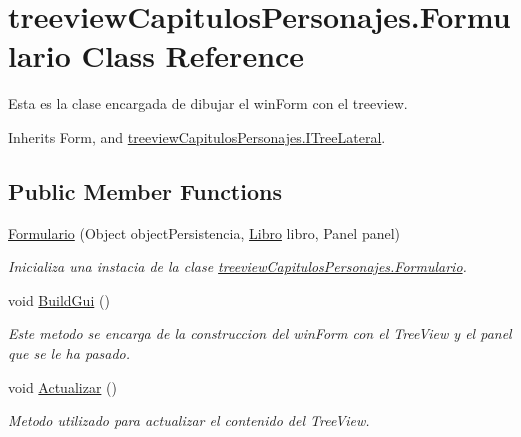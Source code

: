 \hypertarget{classtreeview_capitulos_personajes_1_1_formulario}{\section{treeview\-Capitulos\-Personajes.\-Formulario Class Reference}
\label{classtreeview_capitulos_personajes_1_1_formulario}
}


Esta es la clase encargada de dibujar el win\-Form con el treeview.  




Inherits Form, and \hyperlink{interfacetreeview_capitulos_personajes_1_1_i_tree_lateral}{treeview\-Capitulos\-Personajes.\-I\-Tree\-Lateral}.

\subsection*{Public Member Functions}
\begin{DoxyCompactItemize}
\item 
\hyperlink{classtreeview_capitulos_personajes_1_1_formulario_a0985245ae162dee8885a38bfe08dc213}{Formulario} (Object object\-Persistencia, \hyperlink{classtreeview_capitulos_personajes_1_1_libro}{Libro} libro, Panel panel)
\begin{DoxyCompactList}\small\item\em Inicializa una instacia de la clase \hyperlink{classtreeview_capitulos_personajes_1_1_formulario}{treeview\-Capitulos\-Personajes.\-Formulario}. \end{DoxyCompactList}\item 
void \hyperlink{classtreeview_capitulos_personajes_1_1_formulario_a9efb8a9a36cd60cb1b9d1ed4c7058fc2}{Build\-Gui} ()
\begin{DoxyCompactList}\small\item\em Este metodo se encarga de la construccion del win\-Form con el Tree\-View y el panel que se le ha pasado. \end{DoxyCompactList}\item 
void \hyperlink{classtreeview_capitulos_personajes_1_1_formulario_ace01cf853dd8df12bc1b209ebd9741f9}{Actualizar} ()
\begin{DoxyCompactList}\small\item\em Metodo utilizado para actualizar el contenido del Tree\-View. \end{DoxyCompactList}\end{DoxyCompactItemize}


